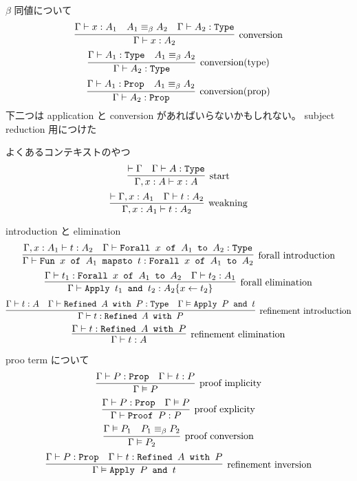 \begin{itembox}[l]{\(\beta\) 同値について}
  \[\infer[\text{conversion}]{\Gamma \vdash x : A_2}{\Gamma \vdash x : A_1 & A_1 \equiv_{\beta} A_2 & \Gamma \vdash A_2 : \texttt{Type}} \]
  \[\infer[\text{conversion(type)}]{\Gamma \vdash A_2 : \texttt{Type}}{\Gamma \vdash A_1 : \texttt{Type} & A_1 \equiv_{\beta} A_2} \]
  \[\infer[\text{conversion(prop)}]{\Gamma \vdash A_2 : \texttt{Prop}}{\Gamma \vdash A_1 : \texttt{Prop} & A_1 \equiv_{\beta} A_2}\]
  下二つは application と conversion があればいらないかもしれない。
  subject reduction 用につけた
\end{itembox}

\begin{itembox}[l]{よくあるコンテキストのやつ}
  \[\infer[\text{start}]{\Gamma , x : A \vdash x : A}{\vdash \Gamma & \Gamma \vdash A : \texttt{Type}} \]
  \[\infer[\text{weakning}]{\Gamma , x : A_1 \vdash t : A_2}{\vdash \Gamma , x : A_1 & \Gamma \vdash t : A_2} \]
\end{itembox}

\begin{itembox}[l]{introduction と elimination}
  \[\infer[\text{forall introduction}]{\Gamma \vdash \texttt{Fun } x \texttt{ of } A_1 \texttt{ mapsto } t : \texttt{Forall } x \texttt{ of } A_1 \texttt{ to } A_2}{\Gamma , x : A_1 \vdash t : A_2 & \Gamma \vdash \texttt{Forall } x \texttt{ of } A_1 \texttt{ to } A_2 : \texttt{Type}} \]
  \[\infer[\text{forall elimination}]{\Gamma \vdash \texttt{Apply } t_1 \texttt{ and } t_2 : A_2\{x \leftarrow t_2\}}{\Gamma \vdash t_1 : \texttt{Forall } x \texttt{ of } A_1 \texttt{ to } A_2 & \Gamma \vdash t_2 : A_1} \]
  \[\infer[\text{refinement introduction}]{\Gamma \vdash t : \texttt{Refined } A \texttt{ with } P}{\Gamma \vdash t : A & \Gamma \vdash \texttt{Refined } A \texttt{ with } P : \texttt{Type} & \Gamma \vDash \texttt{Apply } P \texttt{ and } t} \]
  \[\infer[\text{refinement elimination}]{\Gamma \vdash t : A}{\Gamma \vdash t : \texttt{Refined } A \texttt{ with } P} \]
\end{itembox}
\begin{itembox}[l]{proo term について}
  \[\infer[\text{proof implicity}]{\Gamma \vDash P}{\Gamma \vdash P : \texttt{Prop} & \Gamma \vdash t : P} \]
  \[\infer[\text{proof explicity}]{\Gamma \vdash \texttt{Proof } P : P}{\Gamma \vdash P : \texttt{Prop} &\Gamma \vDash P} \]
  \[\infer[\text{proof conversion}]{\Gamma \vDash P_2}{\Gamma \vDash P_1 & P_1 \equiv_{\beta} P_2} \]
  \[\infer[\text{refinement inversion}]{\Gamma \vDash \texttt{Apply } P \texttt{ and } t}{\Gamma \vdash P : \texttt{Prop} & \Gamma \vdash t : \texttt{Refined } A \texttt{ with } P}\]
\end{itembox}